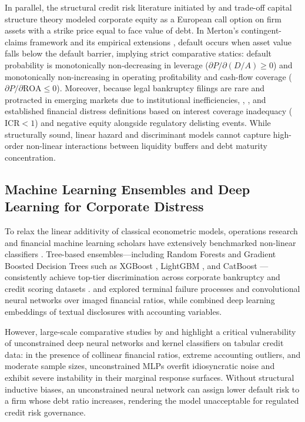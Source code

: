 \documentclass[11pt,a4paper]{article}
\begin{document}
In parallel, the structural credit risk literature initiated by \citet{merton1974pricing} and trade-off capital structure theory \citep{kraus1973state,myers1984capital} modeled corporate equity as a European call option on firm assets with a strike price equal to face value of debt. In Merton's contingent-claims framework and its empirical extensions \citep{hillegeist2004assessing,duffie2007multi,bharath2008forecasting}, default occurs when asset value falls below the default barrier, implying strict comparative statics: default probability is monotonically non-decreasing in leverage ($\partial P / \partial (D/A) \ge 0$) and monotonically non-increasing in operating profitability and cash-flow coverage ($\partial P / \partial \text{ROA} \le 0$). Moreover, because legal bankruptcy filings are rare and protracted in emerging markets due to institutional inefficiencies, \citet{asquith1994anatomy}, \citet{pindado2008estimating}, and \citet{tinoco2013financial} established financial distress definitions based on interest coverage inadequacy ($\text{ICR} < 1$) and negative equity alongside regulatory delisting events. While structurally sound, linear hazard and discriminant models cannot capture high-order non-linear interactions between liquidity buffers and debt maturity concentration.

\subsection{Machine Learning Ensembles and Deep Learning for Corporate Distress}
To relax the linear additivity of classical econometric models, operations research and financial machine learning scholars have extensively benchmarked non-linear classifiers \citep{kumar2007bankruptcy,lessmann2015benchmarking,jones2017predicting}. Tree-based ensembles---including Random Forests \citep{breiman2001random} and Gradient Boosted Decision Trees such as XGBoost \citep{chen2016xgboost}, LightGBM \citep{ke2017lightgbm}, and CatBoost \citep{prokhorenkova2018catboost}---consistently achieve top-tier discrimination across corporate bankruptcy and credit scoring datasets \citep{geng2015prediction,zieba2016ensemble,barboza2017machine,veganzones2018investigation,gunnarsson2021deep}. \citet{dujardin2015bankruptcy} and \citet{hosaka2019bankruptcy} explored terminal failure processes and convolutional neural networks over imaged financial ratios, while \citet{mai2019deep} combined deep learning embeddings of textual disclosures with accounting variables.

However, large-scale comparative studies by \citet{gunnarsson2021deep} and \citet{dumitrescu2022machine} highlight a critical vulnerability of unconstrained deep neural networks and kernel classifiers on tabular credit data: in the presence of collinear financial ratios, extreme accounting outliers, and moderate sample sizes, unconstrained MLPs overfit idiosyncratic noise and exhibit severe instability in their marginal response surfaces. Without structural inductive biases, an unconstrained neural network can assign lower default risk to a firm whose debt ratio increases, rendering the model unacceptable for regulated credit risk governance.
\end{document}
